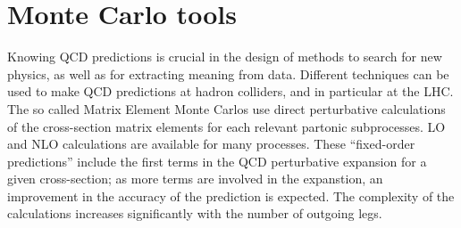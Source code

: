 \section{Monte Carlo tools}\label{sec:MCtools}


Knowing QCD predictions is crucial in the design of methods to search for new physics, as well as for extracting meaning from data. Different techniques can be used to make QCD predictions at hadron colliders, and in particular at the LHC. The so called Matrix Element Monte Carlos use direct perturbative calculations of the cross-section matrix elements  %
for each relevant partonic subprocesses. LO and NLO calculations are available for many processes.   These ``fixed-order predictions'' include the first terms in the QCD perturbative expansion for a given cross-section; as more terms are involved in the expanstion, an improvement in the accuracy of the prediction is expected.  The complexity of the calculations increases significantly with the number of outgoing legs. %




